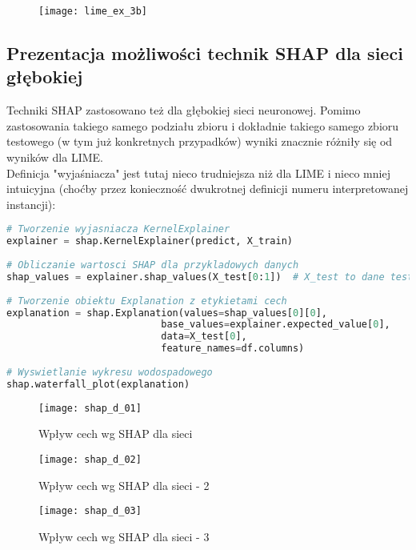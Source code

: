 \begin{figure}[H]
    \centering
    \texttt{[image: lime\_ex\_3b]}
\end{figure}


\subsection{Prezentacja możliwości technik SHAP dla sieci głębokiej}
Techniki SHAP zastosowano też dla głębokiej sieci neuronowej. Pomimo zastosowania takiego samego podziału zbioru i dokładnie takiego samego zbioru testowego (w tym już konkretnych przypadków) wyniki znacznie różniły się od wyników dla LIME.\\

Definicja "wyjaśniacza" jest tutaj nieco trudniejsza niż dla LIME i nieco mniej intuicyjna (choćby przez konieczność dwukrotnej definicji numeru interpretowanej instancji):

\begin{lstlisting}[language=Python, caption=Definicja explainera dla SHAP - 2]
# Tworzenie wyjasniacza KernelExplainer
explainer = shap.KernelExplainer(predict, X_train)
    
# Obliczanie wartosci SHAP dla przykladowych danych
shap_values = explainer.shap_values(X_test[0:1])  # X_test to dane testowe, wybieramy przyklad 0
    
# Tworzenie obiektu Explanation z etykietami cech
explanation = shap.Explanation(values=shap_values[0][0], 
                           base_values=explainer.expected_value[0], 
                           data=X_test[0],
                           feature_names=df.columns)
    
# Wyswietlanie wykresu wodospadowego
shap.waterfall_plot(explanation)
\end{lstlisting}

\begin{figure}[H]
    \centering
    \texttt{[image: shap\_d\_01]}
    \caption{Wpływ cech wg SHAP dla sieci}
    \label{fig:shap_d_01}
\end{figure}

\begin{figure}[H]
    \centering
    \texttt{[image: shap\_d\_02]}
    \caption{Wpływ cech wg SHAP dla sieci - 2}
    \label{fig:shap_d_02}
\end{figure}

\begin{figure}[H]
    \centering
    \texttt{[image: shap\_d\_03]}
    \caption{Wpływ cech wg SHAP dla sieci - 3}
    \label{fig:shap_d_03}
\end{figure}

